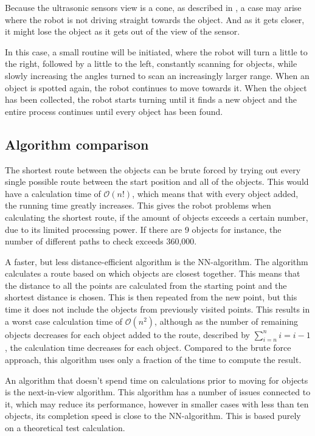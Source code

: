 Because the ultrasonic sensors view is a cone, as described in , a case may arise where the robot is not driving straight towards the object. And as it gets closer, it might lose the object as it gets out of the view of the sensor.

In this case, a small routine will be initiated, where the robot will turn a little to the right, followed by a little to the left, constantly scanning for objects, while slowly increasing the angles turned to scan an increasingly larger range. When an object is spotted again, the robot continues to move towards it. When the object has been collected, the robot starts turning until it finds a new object and the entire process continues until every object has been found.


\subsection{Algorithm comparison} \label{sec:algorithm-desc}

The shortest route between the objects can be brute forced by trying out every single possible route between the start position and all of the objects. This would have a calculation time of $\mathcal{O}(n!)$, which means that with every object added, the running time greatly increases. This gives the robot problems when calculating the shortest route, if the amount of objects exceeds a certain number, due to its limited processing power. If there are 9 objects for instance, the number of different paths to check exceeds 360,000.  

A faster, but less distance-efficient algorithm is the NN-algorithm. The algorithm calculates a route based on which objects are closest together. This means that the distance to all the points are calculated from the starting point and the shortest distance is chosen. This is then repeated from the new point, but this time it does not include the objects from previously visited points. This results in a worst case calculation time of $\mathcal{O}(n^2)$, although as the number of remaining objects decreases for each object added to the route, described by $\sum\limits_{i=n}^n i = i - 1$, the calculation time decreases for each object. Compared to the brute force approach, this algorithm uses only a fraction of the time to compute the result. 

An algorithm that doesn't spend time on calculations prior to moving for objects is the next-in-view algorithm. This algorithm has a number of issues connected to it, which may reduce its performance, however in smaller cases with less than ten objects, its completion speed is close to the NN-algorithm. This is based purely on a theoretical test calculation.

